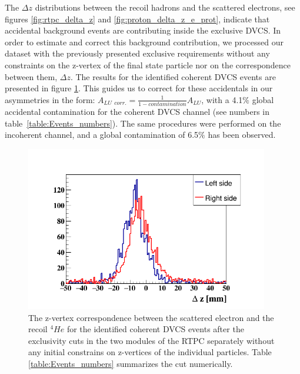 The $\Delta z$ distributions between the recoil hadrons and the scattered 
electrons, see figures \ref{fig:rtpc_delta_z} and 
\ref{fig:proton_delta_z_e_prot}, indicate that accidental background events are 
contributing inside the exclusive DVCS. In order to estimate and correct 
this background contribution, we processed our dataset with the previously 
presented exclusive requirements without any constraints on the z-vertex of the 
final state particle nor on the correspondence between them, $\Delta z$. The 
results for the identified coherent DVCS events are presented in figure 
\ref{fig:delta_z_after_ex}. This guides us to correct for these accidentals in 
our asymmetries in the form: $ A_{LU~~corr.} = \frac{1}{1 - contamination} 
A_{LU}$, with a 4.1$\%$ global accidental contamination for the coherent DVCS 
channel (see numbers in table~\ref{table:Events_numbers}). The same procedures 
were performed on the incoherent channel, and a 
global contamination of 6.5$\%$ has been observed.\\

\begin{figure}[tbp]
\centering
\includegraphics[height=7.2cm]{fig_dvcs/rtpc_delta_z_acc.png}
\caption{The z-vertex correspondence between the scattered electron and the 
   recoil $^{4}He$ for the identified coherent DVCS events after the 
   exclusivity cuts in the two modules of the RTPC separately without any 
   initial constrains on z-vertices of the individual particles.  Table 
\ref{table:Events_numbers} summarizes the cut numerically.}
\label{fig:delta_z_after_ex}
 \end{figure}

